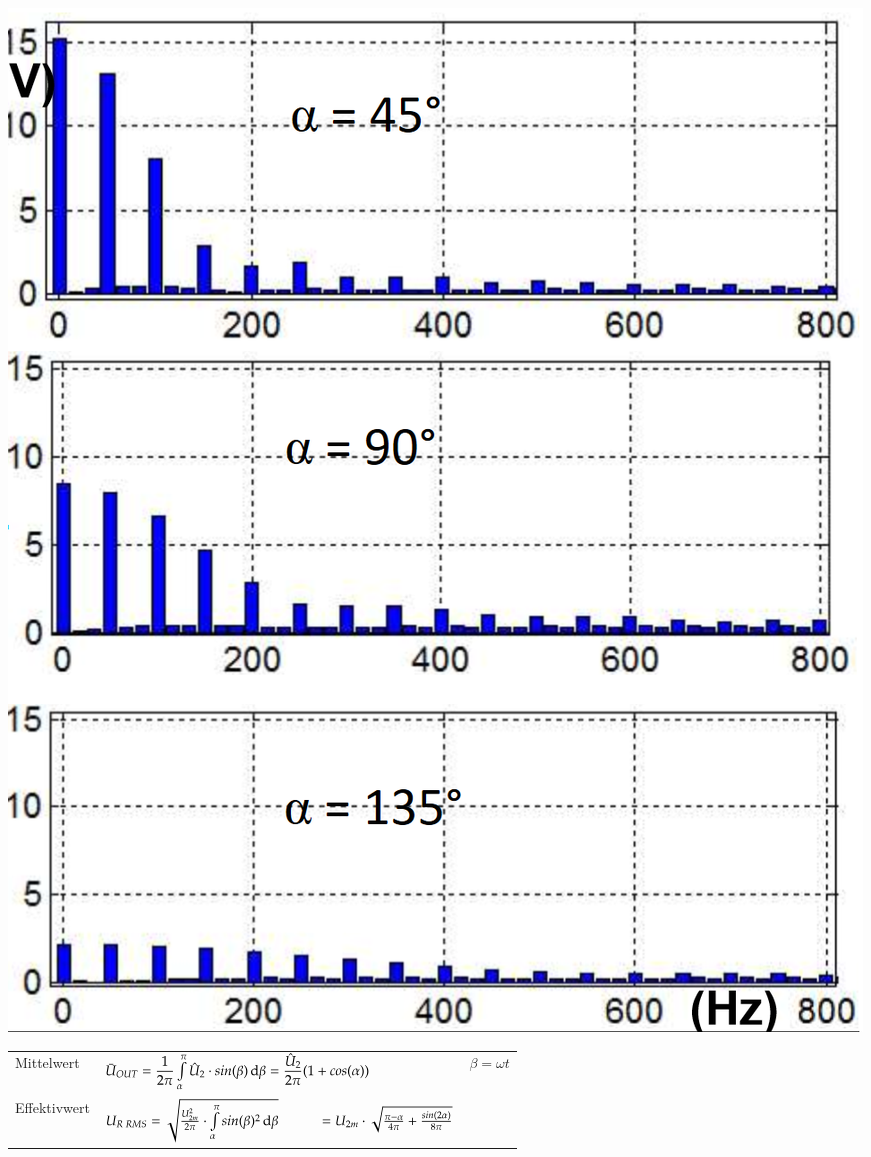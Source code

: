 \begin{minipage}{0.25\linewidth}
    \includegraphics[width=0.8\linewidth]{images/M1COW} 
\end{minipage}
\newline
\vspace{-0.8cm}
\begin{longtable}{ p{}  p{}  p{} |} %
    Mittelwert&
    $ \bar{U}_{OUT} = \dfrac{1}{2\pi} \int\limits_{\alpha}^{\pi}\hat{U}_2\cdot sin(\beta) \mathop{}\!\mathrm{d} \beta =\dfrac{\hat{U}_2}{2\pi}(1+cos(\alpha)) $&
    $ \beta = \omega t $
    \\ 
    
    Effektivwert&
    $ U_{R\; RMS}= \sqrt{\frac{U_{2m}^2}{2\pi}\cdot \int\limits_{\alpha}^{\pi} sin(\beta)^2 \diff \beta} \newline
    \hspace*{1cm}= U_{2m}\cdot \sqrt{\frac{\pi - \alpha}{4 \pi}+ \frac{sin(2\alpha)}{8\pi}}$&
    \\
\end{longtable}
\vspace{-1.2cm}


